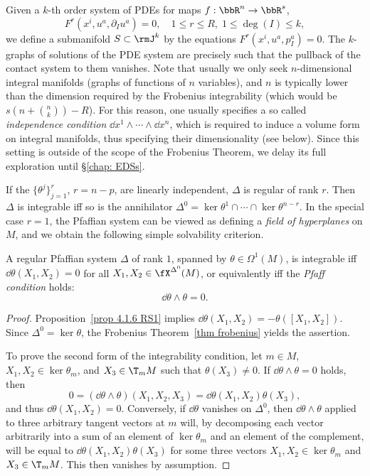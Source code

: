 \begin{rem}
    Given a $k$-th order system of PDEs for maps $f:\bbR^n\to \bbR^s$, 
    \[F^r(x^i,u^a,\partial_I u^a)=0,\quad 1\leq r\leq R,\; 1\leq \deg(I)\leq k,\]
    we define a submanifold $S\subset \rmJ^k$ by the equations $F^r(x^i,u^a,p_I^a)=0$. The $k$-graphs of solutions of the PDE system are precisely such that the pullback of the contact system to them vanishes. Note that usually we only seek $n$-dimensional integral manifolds (graphs of functions of $n$ variables), and $n$ is typically lower than the dimension required by the Frobenius integrability (which would be $s\left(n+\binom{n}{k}\right)-R$). For this reason, one usually specifies a so called \emph{independence condition} $\dd x^1\wedge\cdots\wedge\dd x^n$, which is required to induce a volume form on integral manifolds, thus specifying their dimensionality (see below). Since this setting is outside of the scope of the Frobenius Theorem, we delay its full exploration until \S\ref{chap: EDSs}.
\end{rem}

If the $\{\theta^j\}_{j=1}^r$, $r=n-p$, are linearly independent, $\Delta$ is regular of rank $r$. Then $\Delta$ is integrable iff so is the annihilator $\Delta^0=\ker\theta^1\cap\cdots\cap\ker\theta^{n-r}$. In the special case $r=1$, the Pfaffian system can be viewed as defining a \emph{field of hyperplanes} on $M$, and we obtain the following simple solvability criterion.

\begin{prop}\label{prop 4.7.6 RS1 pfaffian rank 1}
    A regular Pfaffian system $\Delta$ of rank $1$, spanned by $\theta\in\Omega^1(M)$, is integrable iff $\dd\theta(X_1,X_2)=0$ for all $X_1,X_2\in\fX^{\Delta^0}(M)$, or equivalently iff the \emph{Pfaff condition} holds:
    \[\dd\theta\wedge\theta=0.\]
\end{prop}
\begin{proof}
    Proposition~\ref{prop 4.1.6 RS1} implies $\dd\theta(X_1,X_2)=-\theta([X_1,X_2])$. Since $\Delta^0=\ker\theta$, the Frobenius Theorem~\ref{thm frobenius} yields the assertion. 

    To prove the second form of the integrability condition, let $m\in M$, $X_1,X_2\in\ker\theta_m$, and $X_3\in \T_mM$ such that $\theta(X_3)\neq 0$. If $\dd\theta\wedge\theta=0$ holds, then 
    \[0=(\dd\theta\wedge\theta)(X_1,X_2,X_3)=\dd\theta(X_1,X_2)\theta(X_3),\]
    and thus $\dd \theta(X_1,X_2)=0$. Conversely, if $\dd\theta$ vanishes on $\Delta^0$, then $\dd \theta\wedge\theta$ applied to three arbitrary tangent vectors at $m$ will, by decomposing each vector arbitrarily into a sum of an element of $\ker\theta_m$ and an element of the complement, will be equal to $\dd \theta(X_1,X_2)\theta(X_3)$ for some three vectors $X_1,X_2\in \ker\theta_m$ and $X_3\in \T_m M$. This then vanishes by assumption.
\end{proof}

